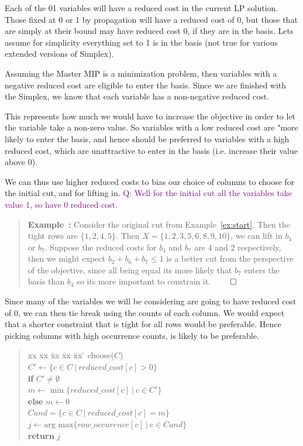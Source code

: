 \documentclass{article}
\newcounter{excount}
\newenvironment{example}{\begin{quote}\refstepcounter{excount}\textbf{Example~\arabic{excount}:}}{\hfill$\qed$\end{quote}}
\newcommand{\question}[1]{\textcolor{purple}{\textsc{Q:} #1}}
\begin{document}
Each of the 01 variables will have a reduced cost in the current LP solution. 
Those fixed at 0 or 1 by propagation will have a reduced cost of 0, but those that are simply at their bound may have reduced cost 0, if they are in the basis.
Lets assume for simplicity everything set to 1 is in the basis (not true for various extended versions of Simplex).

Assuming the Master MIP is a minimization problem, then variables with a negative reduced cost are eligible to enter the basis. Since we are finished with the Simplex, we know that each variable has a non-negative reduced cost. 

This represents how much we would have to increase the objective in order to let the variable take a non-zero value. 
So variables with a low reduced cost are "more likely to enter the basis, and hence should be preferred to variables with a high reduced cost, which are unattractive to enter in the basis (i.e. increase their value above 0).

We can thus use higher reduced costs to bias our choice of columns to choose for the initial cut, and for lifting in.
\question{Well for the initial cut all the variables take value 1, so have 0 reduced cost.}

\begin{example}
    Consider the original cut from Example~\ref{ex:start}. 
    Then the tight rows are
    $\{1, 2, 4, 5\}$. 
    Then $X = \{ 1, 2, 3, 5, 6, 8, 9, 10\}$, we can lift in $b_4$ or $b_7$. Suppose the reduced costs for $b_4$ and $b_7$ are 4 and 2 respectively, then we might expect
    $b_2 + b_6 + b_7 \leq 1$ is a better cut from the perspective of the objective, since all being equal its more likely that $b_7$ enters the basis than $b_4$ so its more important to constrain it. 
\end{example}

Since many of the variables we will be considering are going to have reduced cost of 0, we can then tie break using the counts of each column. 
We would expect that a shorter constraint that is tight for all rows would be preferable. Hence picking columns with high occurrence counts, is likely to be preferable.

\begin{quote} 
\begin{tabbing}
    xx \= xx \= xx \= xx \= xx \= \kill
    \textsf{choose}($C$)  \\
    \> $C' \gets \{ c \in C ~|~ reduced\_cost[c] > 0 \}$ \\
    \> \textbf{if} $C' \neq \emptyset$ \\
    \> \> $m \gets \min \{ reduced\_cost[c] ~|~ c \in C' \} $ \\
    \> \textbf{else} $m \gets 0$ \\
    \> $Cand = \{ c \in C ~|~ reduced\_cost[c] = m \}$ \\
    \> $j \gets \text{arg max}\{ row\_occurence[c] ~|~ c \in Cand \}$ \\
    \> \textbf{return} $j$
\end{tabbing}
\end{quote}
\end{document}
